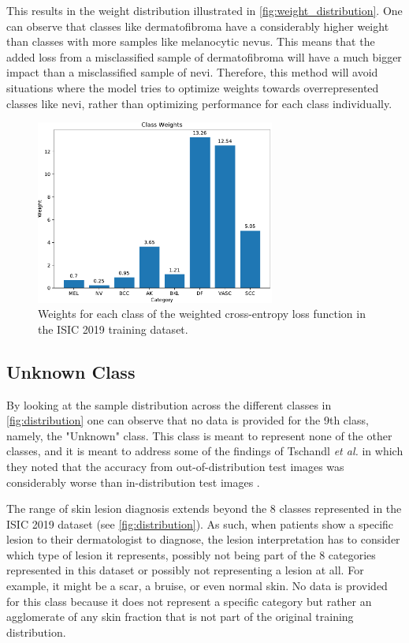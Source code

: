     This results in the weight distribution illustrated in \autoref{fig:weight_distribution}. One can observe that classes like dermatofibroma have a considerably higher weight than classes with more samples like melanocytic nevus. This means that the added loss from a misclassified sample of dermatofibroma will have a much bigger impact than a misclassified sample of nevi. Therefore, this method will avoid situations where the model tries to optimize weights towards overrepresented classes like nevi, rather than optimizing performance for each class individually. \par

    \begin{figure}[h!]
    \centering
      \includegraphics[width=0.7\textwidth,keepaspectratio]{figs/weight_distribution.pdf}
      \caption{Weights for each class of the weighted cross-entropy loss function in the \ac{ISIC} 2019 training dataset.}
      \label{fig:weight_distribution}
    \end{figure}

\subsection{Unknown Class}
\label{subsection:unknown}
    By looking at the sample distribution across the different classes in \autoref{fig:distribution} one can observe that no data is provided for the 9th class, namely, the "Unknown" class. This class is meant to represent none of the other classes, and it is meant to address some of the findings of Tschandl \textit{et al.} in which they noted that the accuracy from out-of-distribution test images was considerably worse than in-distribution test images \cite{humanvsisic2018}. \par
    
    The range of skin lesion diagnosis extends beyond the 8 classes represented in the \ac{ISIC} 2019 dataset (see \autoref{fig:distribution}). As such, when patients show a specific lesion to their dermatologist to diagnose, the lesion interpretation has to consider which type of lesion it represents, possibly not being part of the 8 categories represented in this dataset or possibly not representing a lesion at all. For example, it might be a scar, a bruise, or even normal skin. No data is provided for this class because it does not represent a specific category but rather an agglomerate of any skin fraction that is not part of the original training distribution. \par 
    

